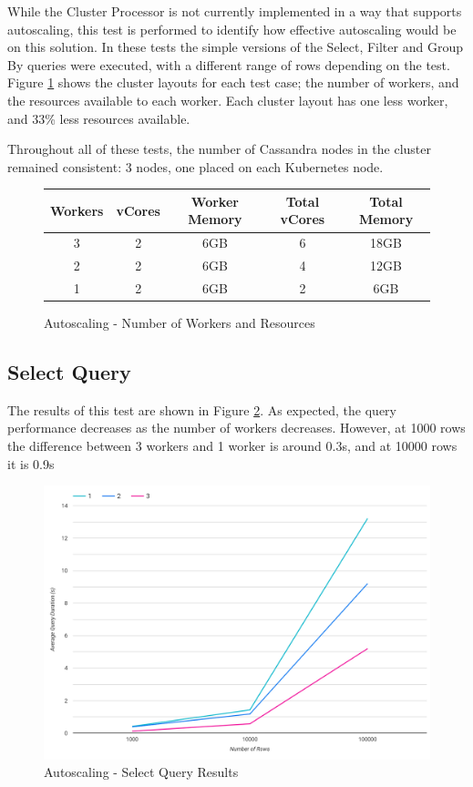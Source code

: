 While the Cluster Processor is not currently implemented in a way that supports autoscaling, this test is performed to identify how effective autoscaling would be on this solution. In these tests the simple versions of the Select, Filter and Group By queries were executed, with a different range of rows depending on the test. Figure \ref{fig:autoscale-test-workers} shows the cluster layouts for each test case; the number of workers, and the resources available to each worker. Each cluster layout has one less worker, and 33\% less resources available.

Throughout all of these tests, the number of Cassandra nodes in the cluster remained consistent: 3 nodes, one placed on each Kubernetes node.

\begin{figure}[ht]
	\centering
	\begin{tabular}{| c | c | c | c | c |}
		\hline
		\textbf{Workers} & \textbf{vCores} & \textbf{Worker Memory} & \textbf{Total vCores} & \textbf{Total Memory} \\ \hline
		3 & 2 & 6GB & 6 & 18GB \\ \hline
		2 & 2 & 6GB & 4 & 12GB \\ \hline
		1 & 2 & 6GB & 2 & 6GB \\ \hline
	\end{tabular}
	\caption{Autoscaling - Number of Workers and Resources}
	\label{fig:autoscale-test-workers}
\end{figure}

\subsection{Select Query}
The results of this test are shown in Figure \ref{fig:select-simple-autoscale-test}. As expected, the query performance decreases as the number of workers decreases. However, at 1000 rows the difference between 3 workers and 1 worker is around 0.3s, and at 10000 rows it is 0.9s

\begin{figure}[ht]
	\centering
	\includegraphics[width=0.8\linewidth]{chapters/diagrams/testing/select-simple-autoscale-test}
	\caption{Autoscaling - Select Query Results}
	\label{fig:select-simple-autoscale-test}
\end{figure}

